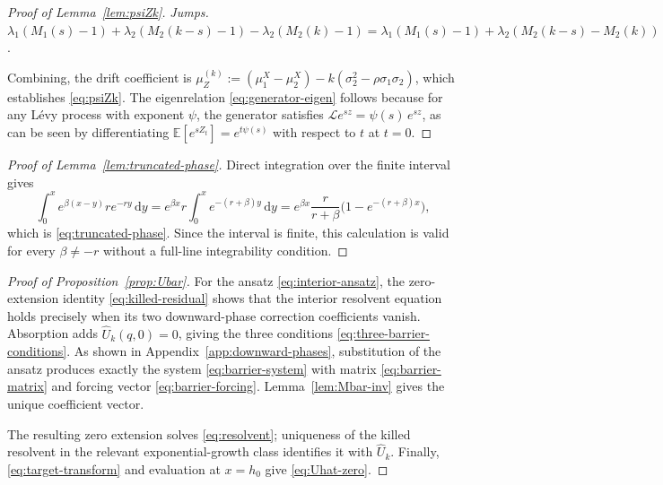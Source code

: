 \documentclass[11pt]{article}
\newcommand{\E}{\mathbb{E}}
\newcommand{\diff}{\mathrm{d}}
\theoremstyle{plain}
\theoremstyle{definition}
\theoremstyle{remark}
\begin{document}
\begin{proof}[Proof of Lemma~\ref{lem:psiZk}]
\smallskip
\noindent\textit{Jumps.}
$\lambda_1(M_1(s)-1)+\lambda_2(M_2(k-s)-1)-\lambda_2(M_2(k)-1)
=\lambda_1(M_1(s)-1)+\lambda_2(M_2(k-s)-M_2(k))$.

\smallskip
Combining, the drift coefficient is
$\mu_Z^{(k)}:=(\mu_1^X-\mu_2^X)-k(\sigma_2^2-\rho\sigma_1\sigma_2)$,
which establishes \eqref{eq:psiZk}.
The eigenrelation \eqref{eq:generator-eigen} follows because for any L\'evy process with
exponent $\psi$, the generator satisfies $\mathcal{L} e^{sz}=\psi(s)\,e^{sz}$, as can be
seen by differentiating $\E[e^{sZ_t}]=e^{t\psi(s)}$ with respect to $t$ at $t=0$.
\end{proof}

\begin{proof}[Proof of Lemma~\ref{lem:truncated-phase}]\label{proof:lem:truncated-phase}
Direct integration over the finite interval gives
\[
\int_0^x e^{\beta(x-y)}r e^{-ry}\,\diff y
=e^{\beta x}r\int_0^x e^{-(r+\beta)y}\,\diff y
=e^{\beta x}\frac{r}{r+\beta}\bigl(1-e^{-(r+\beta)x}\bigr),
\]
which is \eqref{eq:truncated-phase}. Since the interval is finite, this calculation is valid
for every $\beta\neq-r$ without a full-line integrability condition.
\end{proof}

\begin{proof}[Proof of Proposition~\ref{prop:Ubar}]\label{proof:prop:Ubar}
For the ansatz \eqref{eq:interior-ansatz}, the zero-extension identity
\eqref{eq:killed-residual} shows that the interior resolvent equation holds precisely when
its two downward-phase correction coefficients vanish. Absorption adds
$\widehat U_k(q,0)=0$, giving the three conditions \eqref{eq:three-barrier-conditions}. As
shown in Appendix~\ref{app:downward-phases}, substitution of the ansatz produces exactly the system
\eqref{eq:barrier-system} with matrix \eqref{eq:barrier-matrix} and forcing vector
\eqref{eq:barrier-forcing}. Lemma~\ref{lem:Mbar-inv} gives the unique coefficient vector.

The resulting zero extension solves \eqref{eq:resolvent}; uniqueness of the killed resolvent
in the relevant exponential-growth class identifies it with $\widehat U_k$. Finally,
\eqref{eq:target-transform} and evaluation at $x=h_0$ give \eqref{eq:Uhat-zero}.
\end{proof}
\end{document}
